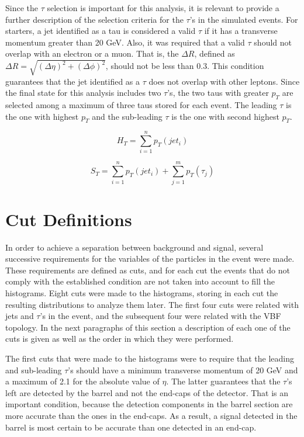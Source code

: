 Since the $\tau$ selection is important for this analysis, it is relevant to provide a further description of the selection criteria for the $\tau$'s in the simulated events. For starters, a jet identified as a tau is considered a valid $\tau$ if it has a transverse momentum greater than 20 GeV. Also, it was required that a valid $\tau$ should not overlap with an electron or a muon. That is, the $\Delta R$, defined as $\Delta R = \sqrt{(\Delta \eta)^2 + (\Delta \phi)^2}$, should not be less than 0.3. This condition guarantees that the jet identified as a $\tau$ does not overlap with other leptons. Since the final state for this analysis includes two $\tau$'s, the two taus with greater $p_{T}$ are selected among a maximum of three taus stored for each event. The leading $\tau$ is the one with highest $p_{T}$ and the sub-leading $\tau$ is the one with second highest $p_{T}$.

\begin{equation}
 H_{T} = \sum_{i=1}^{n} p_{T}(jet_{i})
 \label{eq: HT}
\end{equation}

\begin{equation}
 S_{T} = \sum_{i=1}^{n} p_{T}(jet_{i}) + \sum_{j=1}^{m} p_{T}(\tau_{j})
 \label{eq: ST}
\end{equation}



\section{Cut Definitions} \label{sec: cutdefinitions}

In order to achieve a separation between background and signal, several successive requirements for the variables of the particles in the event were made. These requirements are defined as cuts, and for each cut the events that do not comply with the established condition are not taken into account to fill the histograms. Eight cuts were made to the histograms, storing in each cut the resulting distributions to analyze them later. The first four cuts were related with jets and $\tau$'s in the event, and the subsequent four were related with the VBF topology. In the next paragraphs of this section a description of each one of the cuts is given as well as the order in which they were performed.

The first cuts that were made to the histograms were to require that the leading and sub-leading $\tau$'s should have a minimum transverse momentum of 20 GeV and a maximum of 2.1 for the absolute value of $\eta$. The latter guarantees that the $\tau$'s left are detected by the barrel and not the end-caps of the detector. That is an important condition, because the detection components in the barrel section are more accurate than the ones in the end-caps. As a result, a signal detected in the barrel is most certain to be accurate than one detected in an end-cap.  

